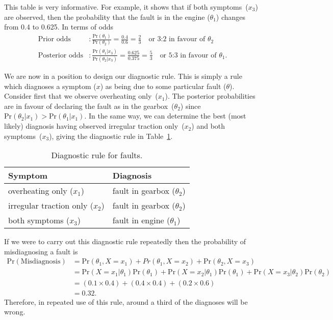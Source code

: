 {This table is very informative. For example, it shows that if both
symptoms~($x_3$) are observed, then the probability that the fault is
in the engine ($\theta_1$) changes from 0.4 to 0.625. In terms of
odds
\begin{align*}
\text{Prior odds}&:\frac{\text{Pr}(\theta_1)}{\text{Pr}(\theta_2)}
=\frac{0.4}{0.6}=\frac{2}{3}\quad\text{or 3:2 in favour of }\theta_2 \\
\text{Posterior odds}&:\frac{\text{Pr}(\theta_1|x_3)}{\text{Pr}(\theta_2|x_3)}
=\frac{0.625}{0.375}=
\frac{5}{3}\quad\text{or 5:3 in favour of }\theta_1.
\end{align*}

\clearpage

We are now in a position to design our diagnostic rule. This is simply
a rule which diagnoses a symptom ($x$) as being due to some particular
fault ($\theta$). Consider first that we observe overheating
only~($x_1$). The posterior probabilities are in favour of declaring
the fault as in the gearbox~($\theta_2$) since
$\text{Pr}(\theta_2|x_1)>\text{Pr}(\theta_1|x_1)$. In the same way, we can determine
the best (most likely) diagnosis having observed irregular traction
only~($x_2$) and both symptoms~($x_3$), giving the diagnostic rule in
Table~\ref{tab:garagediag}.

\begin{table}[ht]
\bigskip

\begin{tabular}{|l|l|}
\hline
\quad\quad Symptom & \quad\quad Diagnosis \\
\hline
overheating only ($x_1$) & fault in gearbox ($\theta_2$) \\
irregular traction only ($x_2$) & fault in gearbox ($\theta_2$) \\
both symptoms ($x_3$) & fault in engine ($\theta_1$) \\
\hline
\end{tabular}
\caption{Diagnostic rule for faults.}
\label{tab:garagediag}

\end{table}

 {
     
         If we were to carry out this diagnostic rule repeatedly then the
        probability of misdiagnosing a fault is
        \begin{align*}
        \text{Pr}(\text{Misdiagnosis}) &=\text{Pr}(\theta_1,X=x_1)+Pr(\theta_1,X=x_2)+\text{Pr}(\theta_2,X=x_3) \\
        &=\text{Pr}(X=x_1|\theta_1)\text{Pr}(\theta_1)+\text{Pr}(X=x_2|\theta_1)\text{Pr}(\theta_1) +\text{Pr}(X=x_3|\theta_2)\text{Pr}(\theta_2) \\
        &=(0.1\times 0.4)+(0.4\times 0.4)+(0.2\times 0.6) \\
        &=0.32.
        \end{align*}
        Therefore, in repeated use of this rule, around a third of the
        diagnoses will be wrong.
     
 }}

